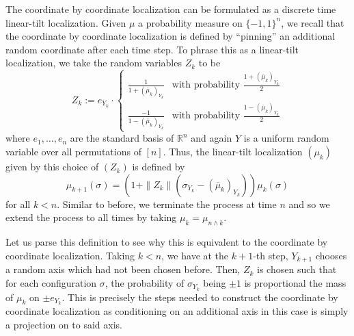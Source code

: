 The coordinate by coordinate localization can be formulated as a discrete time linear-tilt localization.
Given \(\mu\) a probability measure on \(\{-1, 1\}^n\), we recall that the coordinate by coordinate 
localization is defined by ``pinning'' an additional random coordinate after each time step. To phrase 
this as a linear-tilt localization, we take the random variables \(Z_k\) to be
\begin{equation}\label{eq:def_Z}
  Z_k := e_{Y_k} \cdot
    \begin{cases}
      \frac{1}{1 + (\bar{\mu}_k)_{Y_k}} & \text{with probability } \frac{1 + (\bar{\mu}_k)_{Y_k}}{2} \\
      \frac{-1}{1 - (\bar{\mu}_k)_{Y_k}} & \text{with probability } \frac{1 - (\bar{\mu}_k)_{Y_k}}{2}
    \end{cases}
\end{equation}
where \(e_1, \ldots, e_n\) are the standard basis of \(\mathbb{R}^n\) and again \(Y\) is a uniform 
random variable over all permutations of \([n]\). Thus, the linear-tilt localization \((\mu_k)\) given by this 
choice of \((Z_k)\) is defined by
\[\mu_{k + 1}(\sigma) = (1 + \|Z_k\|(\sigma_{Y_k} - (\overline{\mu}_k)_{Y_k}))\mu_k(\sigma)\]
for all \(k < n\). Similar to before, we terminate the process at time \(n\) and so we extend the process 
to all times by taking \(\mu_k = \mu_{n \wedge k}\).

Let us parse this definition to see why this is equivalent to the coordinate by coordinate localization. 
Taking \(k < n\), we have at the \(k + 1\)-th step, \(Y_{k + 1}\) chooses a random axis
which had not been chosen before. Then, \(Z_k\) is chosen such that for each configuration \(\sigma\), 
the probability of \(\sigma_{Y_k}\) being \(\pm 1\) is proportional the mass of \(\mu_k\) on \(\pm e_{Y_k}\). 
This is precisely the steps needed to construct the coordinate by coordinate localization as conditioning 
on an additional axis in this case is simply a projection on to said axis. 